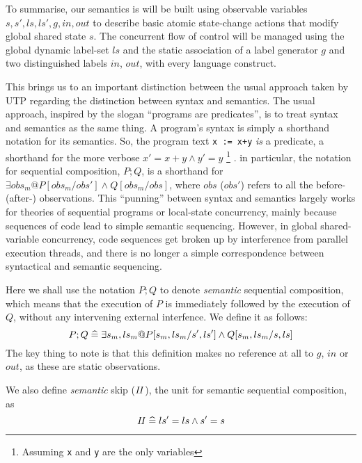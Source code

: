 To summarise,
our semantics is will be built using observable variables
$s,s',ls,ls',g,in,out$ to describe
basic atomic state-change
actions that modify global shared state $s$.
The concurrent flow of control will be  managed using the global dynamic label-set $ls$
and the static association of a label generator $g$
and two distinguished labels $in$, $out$,
with every language construct.

This brings us to an important distinction between the usual approach
taken by UTP regarding the distinction between syntax and semantics.
The usual approach,
inspired by the slogan ``programs are predicates''\cite{predprog,conf/mlpl/Hoare85},
is to treat syntax and semantics as the same thing.
A program's syntax is simply a shorthand notation for its semantics.
So, the program text \texttt{x := x+y} \emph{is} a predicate,
a shorthand for the more verbose $x' = x + y \land y' = y$
\footnote{Assuming \texttt{x} and \texttt{y} are the only variables}
.
in particular, the notation for sequential composition, $P ; Q$,
is a shorthand for
$\exists obs_m @ P[obs_m/obs'] \land Q[obs_m/obs]$,
where $obs$ ($obs'$) refers to all the before- (after-) observations.
This ``punning'' between syntax and semantics largely works for theories
of sequential programs or local-state concurrency,
mainly because sequences of code lead to simple semantic sequencing.
However, in global shared-variable concurrency,
code sequences get broken up by interference from parallel execution threads,
and there is no longer a simple correspondence between syntactical and semantic
sequencing.

Here we shall use the notation $P;Q$
to denote \emph{semantic} sequential composition,
which means that the execution of $P$ is immediately followed by the
execution of $Q$, without any intervening external interfence.
We define it as follows:
\begin{equation}
   P ; Q \mathrel{\widehat=} \exists s_m, ls_m @ P[s_m,ls_m/s',ls'] \land Q[s_m,ls_m/s,ls]
   \label{eqn:semantic-;}
\end{equation}
The key thing to note is that this definition makes no reference at all
to $g$, $in$ or $out$,
as these are static observations.

We also define \emph{semantic} skip ($\mathit{II}$),
the unit for semantic sequential composition,
as
\begin{equation}
  \mathit{II} \mathrel{\widehat=} ls' = ls \land s' = s
\end{equation}
